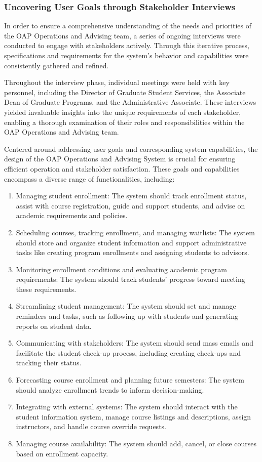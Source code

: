 \documentclass[12pt]{article}
\begin{document}
\subsubsection{Uncovering User Goals through Stakeholder Interviews} 
In order to ensure a comprehensive understanding of the needs and priorities of the OAP Operations and Advising team, a series of ongoing interviews were conducted to engage with stakeholders actively. Through this iterative process, specifications and requirements for the system's behavior and capabilities were consistently gathered and refined.

Throughout the interview phase, individual meetings were held with key personnel, including the Director of Graduate Student Services, the Associate Dean of Graduate Programs, and the Administrative Associate. These interviews yielded invaluable insights into the unique requirements of each stakeholder, enabling a thorough examination of their roles and responsibilities within the OAP Operations and Advising team.

Centered around addressing user goals and corresponding system capabilities, the design of the OAP Operations and Advising System is crucial for ensuring efficient operation and stakeholder satisfaction. These goals and capabilities encompass a diverse range of functionalities, including:

\begin{enumerate}[label=(\roman*)]
    \item Managing student enrollment: The system should track enrollment status, assist with course registration, guide and support students, and advise on academic requirements and policies.
    \item Scheduling courses, tracking enrollment, and managing waitlists: The system should store and organize student information and support administrative tasks like creating program enrollments and assigning students to advisors.
    \item Monitoring enrollment conditions and evaluating academic program requirements: The system should track students' progress toward meeting these requirements.
    \item Streamlining student management: The system should set and manage reminders and tasks, such as following up with students and generating reports on student data.
    \item Communicating with stakeholders: The system should send mass emails and facilitate the student check-up process, including creating check-ups and tracking their status.
    \item Forecasting course enrollment and planning future semesters: The system should analyze enrollment trends to inform decision-making.
    \item Integrating with external systems: The system should interact with the student information system, manage course listings and descriptions, assign instructors, and handle course override requests.
    \item Managing course availability: The system should add, cancel, or close courses based on enrollment capacity.
\end{enumerate}
\end{document}
